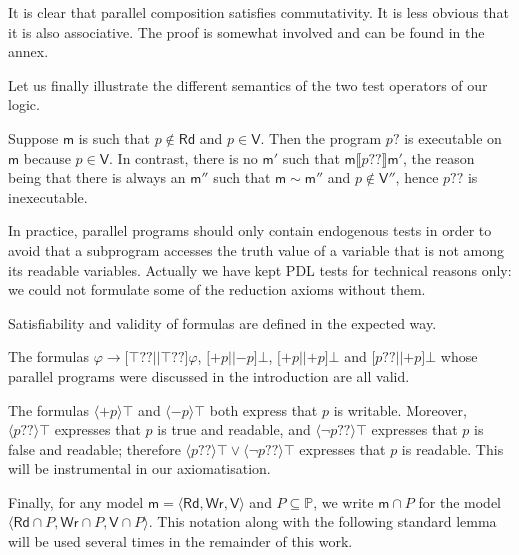 \documentclass{llncs}
\newcommand{\modl}{\mathsf m}
\newcommand{\pll}{ {||} }							%
\newcommand{\readset}{\mathsf{Rd}}
\newcommand{\valuset}{\mathsf{V}}
\newcommand{\writeset}{\mathsf{Wr}}
\newcommand{\testendo}{?\!\!?}			%
\newcommand{\testpdl}{?}				%
\newcommand{\assgntopV}[1]{{\mathtt {+} #1}}
\newcommand{\assgnbotV}[1]{{\mathtt {-} #1}}
\newcommand{\intPgm}[1]{\llbracket #1 \rrbracket}
\newcommand{\lbox}[1]{ \big[ #1 \big] }
\newcommand{\ldia}[1]{ \big\langle #1 \big\rangle}
\newcommand{\limp}{ \rightarrow }
\newcommand{\ndet}{\,{\cup}\,}
\renewcommand{\phi}{\varphi}
\newcommand{\propset}{\mathbb P}
\newcommand{\modinter}{\cap}
\newcommand{\tuple}[1]{ \langle #1 \rangle}
\begin{document}
It is clear that parallel composition satisfies commutativity. 
It is less obvious that it is also associative. 
The proof is somewhat involved and can be found in the annex. 

Let us finally illustrate the different semantics of the two test operators of our logic.

\begin{example}
Suppose $\modl$ is such that $p \notin \readset$ and $p \in \valuset$. 
Then the program $p \testpdl$ is executable on $\modl$ because $p \in \valuset$.
In contrast, there is no $\modl'$ such that $\modl \intPgm{ p \testendo } \modl'$, 
the reason being that there is always an $\modl''$ such that $\modl \sim \modl''$ and $p \notin \valuset''$,
hence $p \testendo$ is inexecutable. %
\end{example}

In practice, parallel programs should only contain endogenous tests in order to avoid that a subprogram accesses the truth value of a variable that is not among its readable variables.
Actually we have kept PDL tests for technical reasons only:
we could not formulate some of the reduction axioms without them. 

Satisfiability and validity of formulas are defined in the expected way.

\begin{example}
The formulas 
$\phi \limp \lbox{ \top \testendo \pll \top \testendo } \phi$, 
$\lbox{ \assgntopV p \pll \assgnbotV p } \bot$,
$\lbox{ \assgntopV p \pll \assgntopV p } \bot$ and 
$\lbox{ p \testendo \pll \assgntopV p } \bot$ 
whose parallel programs were discussed in the introduction are all valid. 
\end{example}

The formulas $\ldia{ \assgntopV p } \top $ and $\ldia{ \assgnbotV p } \top $ both express that $p$ is writable. 
Moreover, $\ldia{ p \testendo} \top $ expresses that $p$ is true and readable, and 
$\ldia{ \lnot p \testendo} \top $ expresses that $p$ is false and readable;
therefore $\ldia{ p \testendo} \top \lor \ldia{ \lnot p \testendo} \top $ 
expresses that $p$ is readable. 
This will be instrumental in our axiomatisation. 

Finally, for any model $\modl = \tuple{\readset, \writeset, \valuset}$ and $P \subseteq \propset$, we write
$\modl \modinter P$ for the model $\tuple{\readset \cap P, \writeset \cap P, \valuset \cap P}$.
This notation along with the following standard lemma
will be used several times in the remainder of this work.
\end{document}

